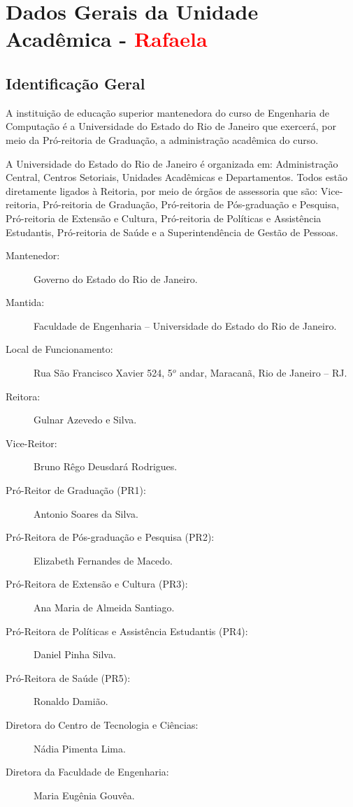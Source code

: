 \chapter{Dados Gerais da Unidade Acadêmica - \textcolor{red}{Rafaela}}


\section{Identificação Geral}

A instituição de educação superior mantenedora do curso de Engenharia de Computação é a Universidade do Estado do Rio de Janeiro que exercerá, por meio da Pró-reitoria de Graduação, a administração acadêmica do curso.

A Universidade do Estado do Rio de Janeiro é organizada em: Administração Central, Centros Setoriais, Unidades Acadêmicas e Departamentos. Todos estão diretamente ligados à Reitoria, por meio de órgãos de assessoria que são: Vice-reitoria, Pró-reitoria de Graduação, Pró-reitoria de Pós-graduação e Pesquisa, Pró-reitoria de Extensão e Cultura, Pró-reitoria de Políticas e Assistência Estudantis, Pró-reitoria de Saúde e a Superintendência de Gestão de Pessoas.


\begin{description}
	\item[Mantenedor:] Governo do Estado do Rio de Janeiro.
	\item [Mantida:] Faculdade de Engenharia -- Universidade do Estado do Rio de Janeiro.
	\item [Local de Funcionamento:] Rua São Francisco Xavier 524, 5$^{o}$ andar, Maracanã, Rio de Janeiro -- RJ.
	\item [Reitora:] Gulnar Azevedo e Silva.
	\item [Vice-Reitor:] Bruno Rêgo Deusdará Rodrigues.
	\item [Pró-Reitor de Graduação (PR1):] Antonio Soares da Silva.
	\item [Pró-Reitora de Pós-graduação e Pesquisa (PR2):] Elizabeth Fernandes de Macedo.
	\item [Pró-Reitora de Extensão e Cultura (PR3):] Ana Maria de Almeida Santiago.
	\item [Pró-Reitora de Políticas e Assistência Estudantis (PR4):] Daniel Pinha Silva.
	\item [Pró-Reitora de Saúde (PR5):] Ronaldo Damião.
	\item [Diretora do Centro de Tecnologia e Ciências:] Nádia Pimenta Lima.
	\item [Diretora da Faculdade de Engenharia:]  Maria Eugênia Gouvêa.
\end{description}

